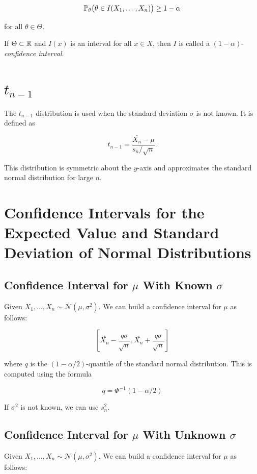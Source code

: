 \[
    \mathbb{P}_{\theta}\bigl( \theta \in I(X_{1}, \ldots, X_{n}) \bigr)
    \ge 1 - \alpha
\]

for all \(\theta \in \Theta\).

If \(\Theta \subset \mathbb{R}\) and \(I(x)\) is an interval for all \(x \in X\), then \(I\) is called a \((1 - \alpha)\)-\emph{confidence interval}.

\section{\texorpdfstring{\(t_{n - 1}\)}{Distribution}}

The \(t_{n - 1}\) distribution is used when the standard deviation \(\sigma\) is not known. 
It is defined as

\[
    t_{n - 1} = \frac{\overline{X_n} - \mu}{s_n/\sqrt{n}}.
\]

This distribution is symmetric about the \(y\)-axis and approximates the standard normal distribution for 
large \(n\).

\section{Confidence Intervals for the Expected Value and Standard Deviation of Normal Distributions}

\subsection{Confidence Interval for \(\mu\) With Known \(\sigma\)}

Given \(X_1,  \dots, X_n \sim \mathcal{N}(\mu, \sigma^2)\). We can build a confidence interval for \(\mu\) as follows:

\[
    \left[\overline{X_n} - \frac{ q \sigma}{\sqrt{n}}, \overline{X_n} + \frac{q \sigma}{\sqrt{n}}\right]
\]

where \(q\) is the \((1 - \alpha/2)\)-quantile of the standard normal distribution. This is computed 
using the formula

\[
    q = \Phi^{-1}(1 - \alpha/2)
\]

If \(\sigma^2\) is not known, we can use \(s_n^2\).

\subsection{Confidence Interval for \(\mu\) With Unknown \(\sigma\)}

Given \(X_1,  \dots, X_n \sim \mathcal{N}(\mu, \sigma^2)\). We can build a confidence interval for \(\mu\) as follows:

